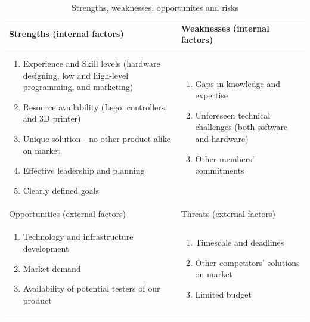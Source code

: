 \documentclass{article}
\begin{document}
\begin{table}[h]
\begin{center}
\begin{tabular}{|p{8cm}|p{8cm}|}
\hline
\rowcolor[HTML]{C0C0C0} 
Strengths (internal factors)                                                                                                                                                                                                                                      & Weaknesses (internal factors)                                                                                          \\ \hline
\begin{enumerate}
  \item Experience and Skill levels (hardware designing, low and high-level programming, and marketing)
  \item Resource availability (Lego, controllers, and 3D printer)
  \item Unique solution - no other product alike on market
  \item Effective leadership and planning
  \item Clearly defined goals
\end{enumerate} & \begin{enumerate}
  \item Gaps in knowledge and expertise
  \item Unforeseen technical challenges (both software and hardware)
  \item Other members' commitments
\end{enumerate} \\ \hline
\rowcolor[HTML]{C0C0C0} 
Opportunities (external factors)                                                                                                                                                                                                                                  & Threats (external factors)                                                                                             \\ \hline
\begin{enumerate}
  \item Technology and infrastructure development
  \item Market demand
  \item Availability of potential testers of our product
\end{enumerate}                                                                                                                                                            & \begin{enumerate}
  \item Timescale and deadlines
  \item Other competitors' solutions on market
  \item Limited budget
\end{enumerate}                                            \\ \hline
\end{tabular}
\end{center}
\caption{Strengths, weaknesses, opportunites and risks}
\label{table:swottable}
\end{table}
\end{document}
